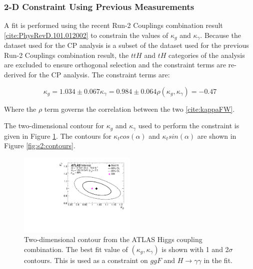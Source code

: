 \subsubsection{2-D Constraint Using Previous Measurements}

A fit is performed using the recent Run-2 Couplings combination result \ref{cite:PhysRevD.101.012002} to constrain the values of $\kappa_{g}$ and $\kappa_{\gamma}$. Because the dataset used for the CP analysis is a subset of the dataset used for the previous Run-2 Couplings combination result, the $ttH$ and $tH$ categories of the analysis are excluded to ensure orthogonal selection and the constraint terms are re-derived for the CP analysis. The constraint terms are:

\begin{equation}
\kappa_{g} = 1.034 \pm 0.067
\kappa_{\gamma} = 0.984 \pm 0.064
\rho(\kappa_{g}, \kappa_{\gamma}) = -0.47
\end{equation}

Where the $\rho$ term governs the correlation between the two \ref{cite:kappaFW}. 

The two-dimensional contour for $\kappa_{g}$ and $\kappa_{\gamma}$ used to perform the constraint is given in Figure \ref{fig:combkgky}. The contours for $\kappa_{t}cos(\alpha)$ and $\kappa_{t}sin(\alpha)$ are shown in Figure \ref{fig:s2:contours}.

\begin{figure}[htbp]
  \centering
\includegraphics[width=0.5\textwidth]{figures/tthcp_results/combination_kgky.pdf}
\caption{Two-dimensional contour from the ATLAS Higgs coupling combination. The best fit value of $(\kappa_g,\kappa_\gamma)$ is shown with 1 and 2$\sigma$ contours. This is used as a constraint on $ggF$ and $H \rightarrow \gamma\gamma$ in the fit. \label{fig:combkgky}}
\end{figure}

